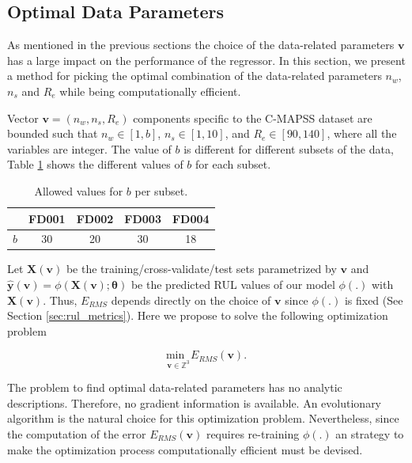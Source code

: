 \documentclass[preprint,12pt]{elsarticle}%
\begin{document}
\subsection{Optimal Data Parameters}

\label{sec:otimal_data_params}

As mentioned in the previous sections the choice of the data-related parameters $\mathbf{v}$ has a large impact on the performance of the regressor. In this section, we present a method  for picking the optimal combination of the data-related parameters $n_{w}$, $n_{s}$ and $R_{e}$ while being computationally efficient.

Vector $\mathbf{v} = (n_{w}, n_{s}, R_{e})$ components specific to the C-MAPSS dataset are bounded such that $n_{w} \in\left[  1, b\right]  $, $n_{s} \in\left[  1, 10\right]  $, and 
$R_{e} \in\left[  90, 140 \right] $, where all the variables are integer. The value of $b$ is different for different subsets of the data, Table \ref{table:b_values} shows the different values of $b$ for each subset.

\begin{table}[H]
\begin{center}
\begin{tabular}
[c]{c|cccc}\hline
& FD001 & FD002 & FD003 & FD004\\\hline
$b$ & 30 & 20 & 30 & 18\\\hline
\end{tabular}
\caption{Allowed values for $b$ per subset.}
\label{table:b_values}
\end{center}
\end{table}

Let $\mathbf{X}(\mathbf{v})$ be the training/cross-validate/test sets parametrized by $\mathbf{v}$ and $\mathbf{\hat{y}}(\mathbf{v}) = \phi(\mathbf{X}(\mathbf{v}); \boldsymbol{\theta})$ be the predicted RUL values of our model $\phi(.)$ with $\mathbf{X}(\mathbf{v})$. Thus, $E_{\scriptscriptstyle RMS}$ depends directly on the choice of $\mathbf{v}$ since $\phi(.)$ is fixed (See Section \ref{sec:rul_metrics}). Here we propose to solve the following optimization problem

\begin{equation}
\underset{\mathbf{v} \in\mathbb{Z}^{3}}{\mathrm{min} \; \;} E_{\scriptscriptstyle RMS}(\mathbf{v}).
\label{eq:optimization_problem}%
\end{equation}

The problem to find optimal data-related parameters has no analytic descriptions. Therefore, no gradient information is available. An evolutionary algorithm is the natural choice for this optimization problem. Nevertheless, since the computation of the error $E_{\scriptscriptstyle RMS}(\mathbf{v})$ requires re-training $\phi(.)$ an strategy to make the optimization process computationally efficient must be devised.
\end{document}
